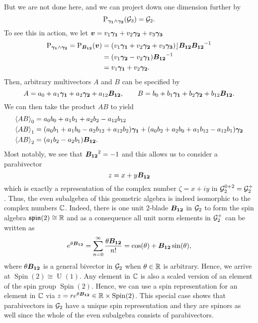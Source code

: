 But we are not done here, and we can project down one dimension further by
\begin{equation}
    \projection_{\blade{\gamma_1} \wedge \blade{\gamma_2}} (\G_3) = \G_2.
\end{equation}
To see this in action, we let $\blade{v}=v_1 \blade{\gamma_1} + v_2 \blade{\gamma_2} + v_3 \blade{\gamma_3}$
\begin{subequations}
\begin{align}
    \projection_{\blade{\gamma_1} \wedge \blade{\gamma_2}} = \projection_{\blade{B_{12}}} (\blade{v}) &= (v_1 \blade{\gamma_1} + v_2 \blade{\gamma_2} + v_3 \blade{\gamma_3})\rfloor \blade{B_{12}}\blade{B_{12}}^{-1}\\
    &= (v_1 \blade{\gamma_2} - v_2 \blade{\gamma_1})\blade{B_{12}}^{-1} \\
    &= v_1 \blade{\gamma_1} + v_2 \blade{\gamma_2}.
\end{align}
\end{subequations}
Then, arbitrary multivectors $A$ and $B$ can be specified by
\[
A = a_0 + a_1 \blade{\gamma_1} + a_2 \blade{\gamma_2} + a_{12} \blade{B_{12}}, \qquad B = b_0 +b_1 \blade{\gamma_1} + b_2 \blade{\gamma_2} + b_{12}\blade{B_{12}}.
\]
We can then take the product $AB$ to yield
\begin{subequations}
\begin{align}
\proj{0}{AB} &= a_0b_0 + a_1 b_1 + a_2 b_2 - a_{12}b_{12}\\
\proj{1}{AB} &= (a_0 b_1 + a_1 b_0 - a_2 b_{12} + a_{12} b_2) \blade{\gamma_1} + (a_0 b_2 + a_2 b_0 + a_1b_{12} - a_{12} b_1) \blade{\gamma_2}\\
\proj{2}{AB} &= (a_1b_2 - a_2 b_1)\blade{B_{12}}.
\end{align}
\end{subequations}
Most notably, we see that $\blade{B_{12}}^2=-1$ and this allows us to consider a parabivector
\begin{equation}
z = x + y \blade{B_{12}}
\end{equation}
which is exactly a representation of the complex number $\zeta = x+ iy$ in $\G_2^{0+2}=\G_2^+$.  Thus, the even subalgebra of this geometric algebra is indeed isomorphic to the complex numbers $\C$. Indeed, there is one unit 2-blade $\blade{B_{12}}$ in $\G_2$ to form the spin algebra $\mathfrak{spin}(2) \cong \R$ and as a consequence all unit norm elements in $\G_2^+$ can be written as
\begin{equation}
   e^{\theta \blade{B_{12}}} = \sum_{n=0}^\infty \frac{\theta \blade{B_{12}}}{n!} = \cos(\theta)+\blade{B_{12}}\sin(\theta),
\end{equation}
where $\theta \blade{B_{12}}$ is a general bivector in $\G_2$ when $\theta \in \R$ is arbitrary. Hence, we arrive at $\operatorname{Spin}(2)\cong \operatorname{U}(1)$. Any element in $\C$ is also a scaled version of an element of the spin group $\operatorname{Spin}(2)$. Hence, we can use a spin representation for an element in $\C$ via $z=re^{\theta \blade{B_{12}}} \in \R\times \operatorname{Spin}(2)$.  This special case shows that parabivectors in $\G_2$ have a unique spin representation and they are spinors as well since the whole of the even subalgebra consists of parabivectors.

